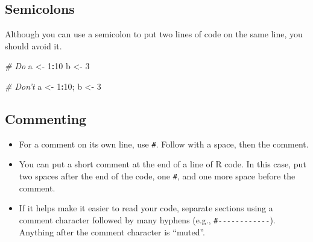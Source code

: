 \documentclass[]{book}
\makeatletter
\newenvironment{Shaded}{\begin{snugshade}}{\end{snugshade}}
\newcommand{\KeywordTok}[1]{\textcolor[rgb]{0.13,0.29,0.53}{\textbf{#1}}}
\newcommand{\DecValTok}[1]{\textcolor[rgb]{0.00,0.00,0.81}{#1}}
\newcommand{\StringTok}[1]{\textcolor[rgb]{0.31,0.60,0.02}{#1}}
\newcommand{\CommentTok}[1]{\textcolor[rgb]{0.56,0.35,0.01}{\textit{#1}}}
\newcommand{\OperatorTok}[1]{\textcolor[rgb]{0.81,0.36,0.00}{\textbf{#1}}}
\newcommand{\NormalTok}[1]{#1}
\providecommand{\tightlist}{%
  \setlength{\itemsep}{0pt}\setlength{\parskip}{0pt}}
\newenvironment{kframe}{%
\medskip{}
\setlength{\fboxsep}{.8em}
 \def\at@end@of@kframe{}%
 \ifinner\ifhmode%
  \def\at@end@of@kframe{\end{minipage}}%
  \begin{minipage}{\columnwidth}%
 \fi\fi%
 \def\FrameCommand##1{\hskip\@totalleftmargin \hskip-\fboxsep
 \colorbox{shadecolor}{##1}\hskip-\fboxsep
     \hskip-\linewidth \hskip-\@totalleftmargin \hskip\columnwidth}%
 \MakeFramed {\advance\hsize-\width
   \@totalleftmargin\z@ \linewidth\hsize
   \@setminipage}}%
 {\par\unskip\endMakeFramed%
 \at@end@of@kframe}
\renewenvironment{Shaded}{\begin{kframe}}{\end{kframe}}
\theoremstyle{definition}
\theoremstyle{definition}
\theoremstyle{definition}
\theoremstyle{remark}
\makeatother
\begin{document}
\begin{Shaded}
\end{Shaded}

\subsection{Semicolons}\label{semicolons}

Although you can use a semicolon to put two lines of code on the same
line, you should avoid it.

\begin{Shaded}
\begin{Highlighting}[]
\CommentTok{# Do}
\NormalTok{a <-}\StringTok{ }\DecValTok{1}\OperatorTok{:}\DecValTok{10}
\NormalTok{b <-}\StringTok{ }\DecValTok{3}

\CommentTok{# Don't}
\NormalTok{a <-}\StringTok{ }\DecValTok{1}\OperatorTok{:}\DecValTok{10}\NormalTok{; b <-}\StringTok{ }\DecValTok{3}
\end{Highlighting}
\end{Shaded}

\subsection{Commenting}\label{commenting}

\begin{itemize}
\tightlist
\item
  For a comment on its own line, use \texttt{\#}. Follow with a space,
  then the comment.
\item
  You can put a short comment at the end of a line of R code. In this
  case, put two spaces after the end of the code, one \texttt{\#}, and
  one more space before the comment.
\item
  If it helps make it easier to read your code, separate sections using
  a comment character followed by many hyphens (e.g.,
  \texttt{\#-\/-\/-\/-\/-\/-\/-\/-\/-\/-\/-\/-}). Anything after the
  comment character is ``muted''.
\end{itemize}
\end{document}
